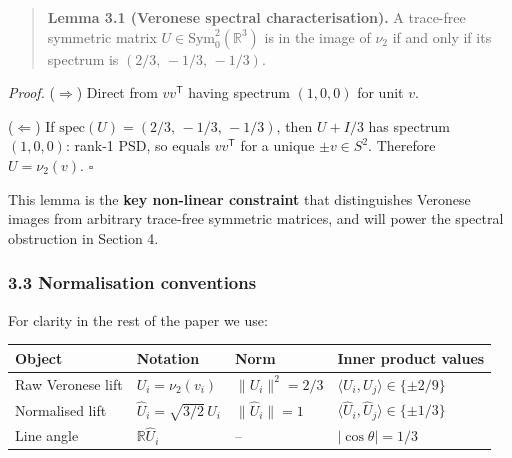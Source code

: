 \documentclass[
]{article}
\begin{document}
\begin{quote}
\textbf{Lemma 3.1 (Veronese spectral characterisation).} A trace-free
symmetric matrix \(U \in \mathrm{Sym}^2_0(\mathbb{R}^3)\) is in the
image of \(\nu_2\) if and only if its spectrum is
\((2/3,\,-1/3,\,-1/3)\).
\end{quote}

\emph{Proof.} (\(\Rightarrow\)) Direct from \(vv^{\mathsf T}\) having
spectrum \((1, 0, 0)\) for unit \(v\).

(\(\Leftarrow\)) If \(\mathrm{spec}(U) = (2/3,\,-1/3,\,-1/3)\), then
\(U + I/3\) has spectrum \((1, 0, 0)\): rank-1 PSD, so equals
\(v v^{\mathsf T}\) for a unique \(\pm v \in S^2\). Therefore
\(U = \nu_2(v)\). \(\square\)

This lemma is the \textbf{key non-linear constraint} that distinguishes
Veronese images from arbitrary trace-free symmetric matrices, and will
power the spectral obstruction in Section 4.

\subsubsection{3.3 Normalisation
conventions}\label{normalisation-conventions}

For clarity in the rest of the paper we use:

\begin{longtable}[]{@{}
  >{\raggedright\arraybackslash}p{}
  >{\raggedright\arraybackslash}p{}
  >{\raggedright\arraybackslash}p{}
  >{\raggedright\arraybackslash}p{}@{}}
\toprule\noalign{}
\begin{minipage}[b]{\linewidth}\raggedright
Object
\end{minipage} & \begin{minipage}[b]{\linewidth}\raggedright
Notation
\end{minipage} & \begin{minipage}[b]{\linewidth}\raggedright
Norm
\end{minipage} & \begin{minipage}[b]{\linewidth}\raggedright
Inner product values
\end{minipage} \\
\midrule\noalign{}
\endhead
\bottomrule\noalign{}
\endlastfoot
Raw Veronese lift & \(U_i = \nu_2(v_i)\) & \(\|U_i\|^2 = 2/3\) &
\(\langle U_i, U_j\rangle \in \{\pm 2/9\}\) \\
Normalised lift & \(\hat U_i = \sqrt{3/2}\,U_i\) & \(\|\hat U_i\| = 1\)
& \(\langle \hat U_i, \hat U_j\rangle \in \{\pm 1/3\}\) \\
Line angle & \(\mathbb{R}\hat U_i\) & -- & \(|\cos\theta| = 1/3\) \\
\end{longtable}
\end{document}
